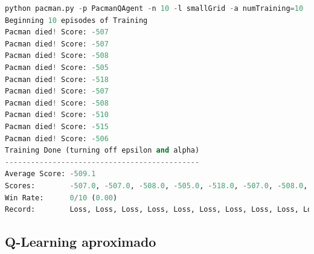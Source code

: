 \documentclass{report}
\begin{document}
\begin{lstlisting}[language=Python, caption=Ejecución de Q-Learning y Pacman 2]
python pacman.py -p PacmanQAgent -n 10 -l smallGrid -a numTraining=10
Beginning 10 episodes of Training
Pacman died! Score: -507
Pacman died! Score: -507
Pacman died! Score: -508
Pacman died! Score: -505
Pacman died! Score: -518
Pacman died! Score: -507
Pacman died! Score: -508
Pacman died! Score: -510
Pacman died! Score: -515
Pacman died! Score: -506
Training Done (turning off epsilon and alpha)
---------------------------------------------
Average Score: -509.1
Scores:        -507.0, -507.0, -508.0, -505.0, -518.0, -507.0, -508.0, -510.0, -515.0, -506.0
Win Rate:      0/10 (0.00)
Record:        Loss, Loss, Loss, Loss, Loss, Loss, Loss, Loss, Loss, Loss
\end{lstlisting}
        \clearpage
      \subsection{Q-Learning aproximado} %
\end{document}
